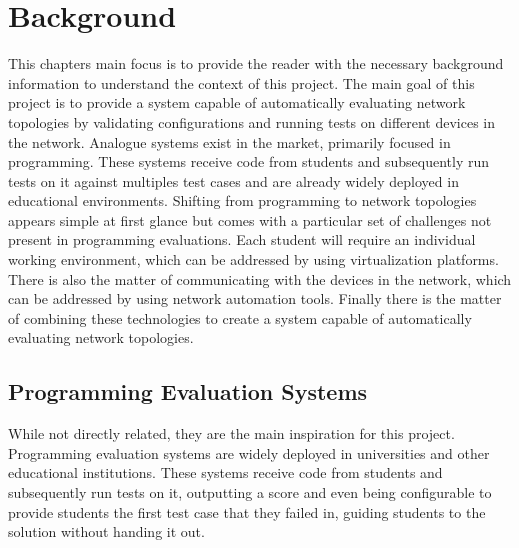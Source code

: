 
\chapter{Background}


\label{ChapterBackground}


This chapters main focus is to provide the reader with the necessary background information to understand the context of
this project. The main goal of this project is to provide a system capable of automatically evaluating network topologies 
by validating configurations and running tests on different devices in the network. Analogue systems exist in the market,
primarily focused in programming. These systems receive code from students and subsequently run tests on it against 
multiples test cases and are already widely deployed in educational environments. 
Shifting from programming to network topologies appears simple at first glance but comes with a particular set of 
challenges not present in programming evaluations. Each student will require an individual working environment, which can 
be addressed by using virtualization platforms. There is also the matter of communicating with the devices in the network, 
which can be addressed by using network automation tools. Finally there is the matter of combining these technologies to 
create a system capable of automatically evaluating network topologies.

\section{Programming Evaluation Systems}
While not directly related, they are the main inspiration for this project. Programming evaluation systems are widely
deployed in universities and other educational institutions. These systems receive code from students and subsequently run
tests on it, outputting a score and even being configurable to provide students the first test case that they failed in, 
guiding students to the solution without handing it out.

